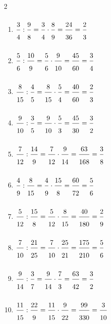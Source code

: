 \ExoC
\begin{multicols}{2}
\begin{enumerate}[leftmargin=*,align=parleft, label=\alph*), itemsep=6pt, topsep=2pt]
\item $\FA{3}{4}:\FA{9}{8}=\FA{3}{4}\cdot\FA{8}{9}=\FA{24}{36}=\FA{2}{3}$
\item $\FA{5}{6}:\FA{10}{9}=\FA{5}{6}\cdot\FA{9}{10}=\FA{45}{60}=\FA{3}{4}$
\item $\FA{8}{15}:\FA{4}{5}=\FA{8}{15}\cdot\FA{5}{4}=\FA{40}{60}=\FA{2}{3}$
\item $\FA{9}{10}:\FA{3}{5}=\FA{9}{10}\cdot\FA{5}{3}=\FA{45}{30}=\FA{3}{2}$
\item $\FA{7}{12}:\FA{14}{9}=\FA{7}{12}\cdot\FA{9}{14}=\FA{63}{168}=\FA{3}{8}$
\item $\FA{4}{9}:\FA{8}{15}=\FA{4}{9}\cdot\FA{15}{8}=\FA{60}{72}=\FA{5}{6}$
\item $\FA{5}{12}:\FA{15}{8}=\FA{5}{12}\cdot\FA{8}{15}=\FA{40}{180}=\FA{2}{9}$
\item $\FA{7}{10}:\FA{21}{25}=\FA{7}{10}\cdot\FA{25}{21}=\FA{175}{210}=\FA{5}{6}$
\item $\FA{9}{14}:\FA{3}{7}=\FA{9}{14}\cdot\FA{7}{3}=\FA{63}{42}=\FA{3}{2}$
\item $\FA{11}{15}:\FA{22}{9}=\FA{11}{15}\cdot\FA{9}{22}=\FA{99}{330}=\FA{3}{10}$
\end{enumerate}
\end{multicols}